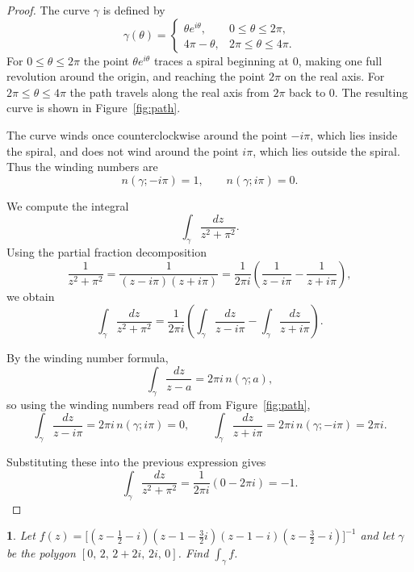 \documentclass[12pt, a4paper]{report}
\theoremstyle{spaced}
\newtheorem{exercise}{}
\newcommand{\setexercise}[1]{\setcounter{exercise}{#1-1}}
\begin{document}
\begin{proof}
	The curve $\gamma$ is defined by
	\[
		\gamma(\theta)=
		\begin{cases}
			\theta e^{i\theta}, & 0\le \theta \le 2\pi,     \\[4pt]
			4\pi-\theta,        & 2\pi \le \theta \le 4\pi.
		\end{cases}
	\]
	For $0\le\theta\le 2\pi$ the point $\theta e^{i\theta}$ traces a spiral beginning at $0$,
	making one full revolution around the origin, and reaching the point $2\pi$ on the real axis.
	For $2\pi\le\theta\le 4\pi$ the path travels along the real axis from $2\pi$ back to $0$.
	The resulting curve is shown in Figure~\ref{fig:path}.

	\medskip
	The curve winds once counterclockwise
	around the point $-i\pi$, which lies inside the spiral,
	and does not wind around the point $i\pi$, which lies outside the spiral.
	Thus the winding numbers are
	\[
		n(\gamma;-i\pi)=1,
		\qquad
		n(\gamma;i\pi)=0.
	\]

	We compute the integral
	\[
		\int_\gamma \frac{dz}{z^{2}+\pi^{2}}.
	\]
	Using the partial fraction decomposition
	\[
		\frac{1}{z^{2}+\pi^{2}}
		=\frac{1}{(z-i\pi)(z+i\pi)}
		=\frac{1}{2\pi i} \left( \frac{1}{z-i\pi} - \frac{1}{z+i\pi} \right),
	\]
	we obtain
	\[
		\int_\gamma \frac{dz}{z^{2}+\pi^{2}}
		=
		\frac{1}{2\pi i}
		\left(
		\int_\gamma \frac{dz}{z-i\pi}
		-
		\int_\gamma \frac{dz}{z+i\pi}
		\right).
	\]

	By the winding number formula,
	\[
		\int_\gamma \frac{dz}{z-a}
		=
		2\pi i\, n(\gamma;a),
	\]
	so using the winding numbers read off from Figure~\ref{fig:path},
	\[
		\int_\gamma \frac{dz}{z-i\pi}
		=2\pi i\,n(\gamma;i\pi)=0,
		\qquad
		\int_\gamma \frac{dz}{z+i\pi}
		=2\pi i\,n(\gamma;-i\pi)=2\pi i.
	\]

	Substituting these into the previous expression gives
	\[
		\int_\gamma \frac{dz}{z^{2}+\pi^{2}}
		=
		\frac{1}{2\pi i}(0-2\pi i)
		= -1.
	\]
\end{proof}


\setexercise{7}
\begin{exercise}
	Let
	\(
	f(z) = \big[(z - \tfrac{1}{2} - i)(z - 1 - \tfrac{3}{2}i)(z - 1 - i)(z - \tfrac{3}{2} - i)\big]^{-1}
	\)
	and let $\gamma$ be the polygon $[0,\, 2,\, 2+2i,\, 2i,\, 0]$.
	Find $\displaystyle \int_{\gamma} f$.
\end{exercise}
\end{document}
